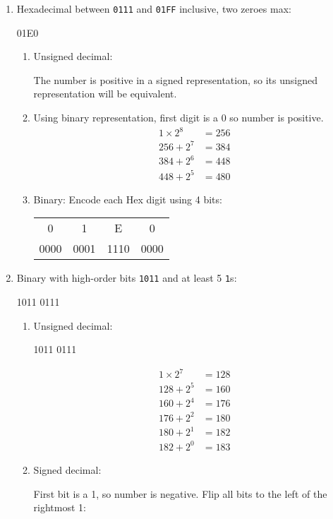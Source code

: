 \documentclass[11pt]{article}
\begin{document}
\begin{enumerate}
\item Hexadecimal between \texttt{0111} and \texttt{01FF} inclusive, two zeroes max:

01E0

\begin{enumerate}
\item Unsigned decimal:

	The number is positive in a signed representation, so its unsigned representation will be equivalent. \pagebreak
	
\item {}

	Using binary representation, first digit is a 0 so number is positive.
	\begin{align*}
		1\times 2^8 &= 256\\
		256+2^7 &= 384\\
		384+2^6 &= 448\\
		448+2^5 &= \boxed{480}		
	\end{align*}
\item Binary:\linebreak
	Encode each Hex digit using 4 bits:
		\begin{tabular}{c c c c}
			0 & 1 & E & 0\\
			0000 & 0001 & 1110 & 0000
		\end{tabular}
		

\end{enumerate}

\item Binary with high-order bits \texttt{1011} and at least 5 \texttt{1}s:

1011 0111

\begin{enumerate}
\item Unsigned decimal:

1011 0111

\begin{align*}
1 \times 2^7 &= 128\\
128 + 2^5&=160\\
160+2^4&=176\\
176+2^2&=180\\
180 + 2^1 &= 182\\
182+2^0 &= \boxed{183}
\end{align*}
\item Signed decimal:

First bit is a 1, so number is negative. Flip all bits to the left of the rightmost 1:


\end{enumerate}
\end{enumerate}
\end{document}
